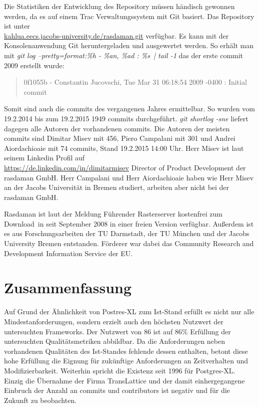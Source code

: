Die Statistiken der Entwicklung des Repository müssen händisch gewonnen werden, da es auf einem Trac Verwaltungssystem mit Git basiert.
Das Repository ist unter\\\url{kahlua.eecs.jacobs-university.de/rasdaman.git} verfügbar.
Es kann mit der Konsolenanwendung Git heruntergeladen und ausgewertet werden.
So erhält man mit \textit{git log --pretty=format:\grqq \%h - \%an, \%ad : \%s\grqq\ | tail -1} das der erste commit 2009 erstellt wurde:
\begin{quote}
0f1055b - Constantin Jucovschi, Tue Mar 31 06:18:54 2009 -0400 : Initial commit
\end{quote}
Somit sind auch die commits des vergangenen Jahres ermittelbar.
So wurden vom 19.2.2014 bis zum 19.2.2015 1949 commits durchgeführt.
\textit{git shortlog -sne} liefert dagegen alle Autoren der vorhandenen commits.
Die Autoren der meisten commits sind Dimitar Misev mit 456, Piero Campalani mit 301 und Andrei Aiordachioaie mit 74 commits, Stand 19.2.2015 14:00 Uhr.
Herr Misev ist laut seinem Linkedin Profil auf\\\url{https://de.linkedin.com/in/dimitarmisev} Director of Product Development der \mbox{rasdaman} GmbH.
Herr Campalani und Herr Aiordachioaie haben wie Herr Misev an der Jacobs Universität in Bremen studiert, arbeiten aber nicht bei der \mbox{rasdaman} GmbH.

Rasdaman ist laut der Meldung \glqq Führender Rasterserver kostenfrei zum Download\grqq\ in \cite{website:rasdaman-newsarchive} seit September 2008 in einer freien Version verfügbar.
Außerdem ist es aus Forschungsarbeiten der TU Darmstadt, der TU München und der Jacobs University Bremen entstanden.
Förderer war dabei das Community Research and Development Information Service der EU. \cite{website:rasdaman-cordis}

\section{Zusammenfassung}
Auf Grund der Ähnlichkeit von Postres-XL zum Ist-Stand erfüllt es nicht nur alle Mindestanforderungen, sondern erzielt auch den höchsten Nutzwert der untersuchten Frameworks.
Der Nutzwert von 86 ist auf 86\% Erfüllung der untersuchten Qualitätsmetriken abbildbar.
Da die Anforderungen neben vorhandenen Qualitäten des Ist-Standes fehlende dessen enthalten, betont diese hohe Erfüllung die Eignung für zukünftige Anforderungen an Zeitverhalten und Modifizierbarkeit.
Weiterhin spricht die Existenz seit 1996 für Postgres-XL.
Einzig die Übernahme der Firma TransLattice und der damit einhergegangene Einbruch der Anzahl an commits und contributors ist negativ und für die Zukunft zu beobachten.

